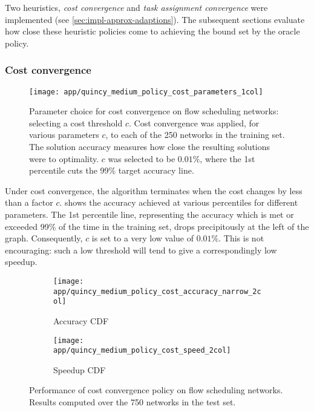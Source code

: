 Two heuristics, \emph{cost convergence} and \emph{task assignment convergence} were implemented (see \cref{sec:impl-approx-adaptions}). The subsequent sections evaluate how close these heuristic policies come to achieving the bound set by the oracle policy.

\subsubsection{Cost convergence}

\begin{figure}
    \centering
    \texttt{[image: app/quincy\_medium\_policy\_cost\_parameters\_1col]}
    \caption[Parameter choice for cost convergence with flow scheduling]{Parameter choice for cost convergence on flow scheduling networks: selecting a cost threshold $c$. Cost convergence was applied, for various parameters $c$, to each of the 250 networks in the training set. The solution accuracy measures how close the resulting solutions were to optimality. $c$ was selected to be $0.01\%$, where the {\color{matplotlib_blue} 1st percentile} cuts the 99\% target accuracy line.}
    \label{fig:app-quincy-medium-cost-parameters}
\end{figure}

Under cost convergence, the algorithm terminates when the cost changes by less than a factor $c$.  shows the accuracy achieved at various percentiles for different parameters. The {\color{matplotlib_blue} 1st percentile} line, representing the accuracy which is met or exceeded 99\% of the time in the training set, drops precipitously at the left of the graph. Consequently, $c$ is set to a very low value of $0.01\%$. This is not encouraging: such a low threshold will tend to give a correspondingly low speedup.

\begin{figure}
    \begin{widepage}
        \begin{subfigure}[c]{0.5\textwidth}
            \texttt{[image: app/quincy\_medium\_policy\_cost\_accuracy\_narrow\_2col]}
            \caption{Accuracy CDF}
            \label{fig:app-quincy-medium-cost-cdf:accuracy}
        \end{subfigure}
        \begin{subfigure}[c]{0.5\textwidth}
            \texttt{[image: app/quincy\_medium\_policy\_cost\_speed\_2col]}
            \caption{Speedup CDF}
            \label{fig:app-quincy-medium-cost-cdf:speedup}
        \end{subfigure}
    \end{widepage}
    \caption[Performance of cost convergence on flow scheduling networks]{Performance of cost convergence policy on flow scheduling networks. Results computed over the 750 networks in the test set.}
    \label{fig:app-quincy-medium-cost-cdf}
\end{figure}

